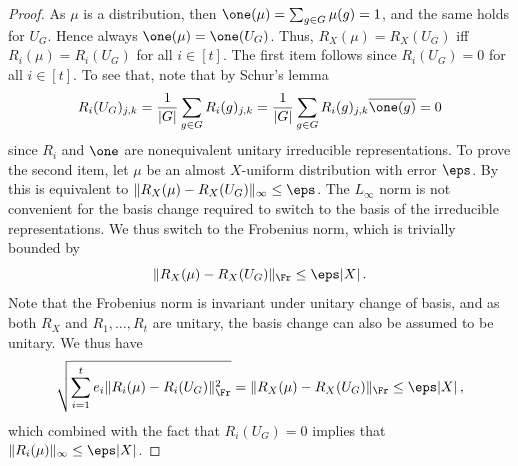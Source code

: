 \begin{proof}
As $\mu$ is a distribution, then $\one(\mu) =
\sum_{g \in G}\mu(g)=1$, and the same holds for $U_G$. Hence always
$\one(\mu)=\one(U_G)$. Thus, $R_X(\mu)=R_X(U_G)$ iff $R_i(\mu)=R_i(U_G)$
for all $i \in [t]$. The first item follows since $R_i(U_G)=0$ for all
$i \in [t]$. To see that, note that by Schur's lemma $$ R_i(U_G)_{j,k}
= \frac{1}{|G|} \sum_{g \in G} R_i(g)_{j,k} = \frac{1}{|G|} \sum_{g
\in G} R_i(g)_{j,k} \overline{\one(g)} = 0 $$ since $R_i$ and $\one$
are nonequivalent unitary irreducible representations. To prove the
second item, let $\mu$ be an almost $X$-uniform distribution with
error $\eps$. By  this is
equivalent to $\|R_X(\mu)-R_X(U_G)\|_{\infty} \le \eps$. The $L_{\infty}$
norm is not convenient for the basis change required to switch to the
basis of the irreducible representations. We thus switch to the Frobenius
norm, which is trivially bounded by $$\|R_X(\mu)-R_X(U_G)\|_{\Fr}
\le \eps |X|\,.$$ Note that the Frobenius norm is invariant under
unitary change of basis, and as both $R_X$ and $R_1,\ldots,R_t$
are unitary, the basis change can also be assumed to be unitary. We
thus have $$ \sqrt{\sum_{i=1}^t e_i \|R_i(\mu)-R_i(U_G)\|^2_{\Fr}} =
\|R_X(\mu)-R_X(U_G)\|_{\Fr} \le \eps |X|\,,$$ which combined with the
fact that $R_i(U_G)=0$ implies that $\|R_i(\mu)\|_{\infty} \le \eps |X|$.
\end{proof}
